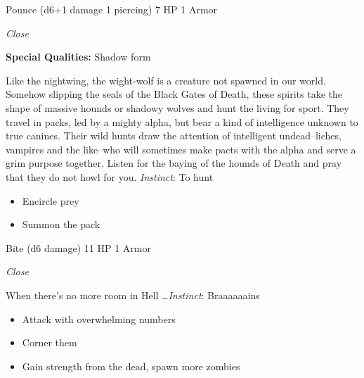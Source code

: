 \HRule
{}

Pounce (d6+1 damage 1 piercing)\hspace*{\fill} 7 HP 1 Armor

\emph{Close}

\textbf{Special Qualities:}
Shadow form

\HRule
Like the nightwing, the wight-wolf is a creature not spawned in our world. Somehow slipping the seals of the Black Gates of Death, these spirits take the shape of massive hounds or shadowy wolves and hunt the living for sport. They travel in packs, led by a mighty alpha, but bear a kind of intelligence unknown to true canines. Their wild hunts draw the attention of intelligent undead--liches, vampires and the like--who will sometimes make pacts with the alpha and serve a grim purpose together. Listen for the baying of the hounds of Death and pray that they do not howl for you. \emph{Instinct}: To hunt
\begin{itemize}
\item Encircle prey
\item Summon the pack
\end{itemize}

\HRule
{}

Bite (d6 damage)\hspace*{\fill} 11 HP 1 Armor

\emph{Close}

\HRule
When there's no more room in Hell \ldots  \emph{Instinct}: Braaaaaains
\begin{itemize}
\item Attack with overwhelming numbers
\item Corner them
\item Gain strength from the dead, spawn more zombies
\end{itemize}
